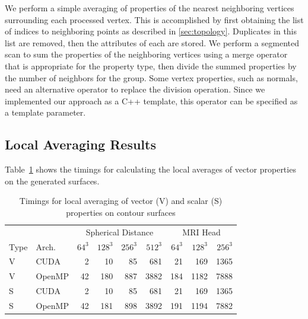 \documentclass[journal]{vgtc}                %
\begin{document}
We perform a simple averaging of properties of the nearest neighboring vertices surrounding each processed vertex. This is accomplished by first obtaining the list of indices to neighboring points as described in \ref{sec:topology}. Duplicates in this list are removed, then the attributes of each are stored. We perform a segmented scan \cite{Blelloch1991} to sum the properties of the neighboring vertices using a merge operator that is appropriate for the property type, then divide the summed properties by the number of neighbors for the group. Some vertex properties, such as normals, need an alternative operator to replace the division operation. Since we implemented our approach as a C++ template, this operator can be specified as a template parameter.

\subsection{Local Averaging Results}

Table~\ref{tab:timingsaverage} shows the timings for calculating the local averages of vector properties on the generated surfaces.


\begin{table}[h!]
\begin{center}
\begin{tabular}{l l|r r r r|r r r}
& & \multicolumn{4}{|c|}{Spherical Distance} & \multicolumn{3}{|c}{MRI Head}\\
Type & Arch. & $64^3$ & $128^3$ & $256^3$ & $512^3$ & $64^3$ & $128^3$ & $256^3$\\
\hline
V & CUDA & 2 & 10 & 85 & 681 & 21 & 169 & 1365 \\
V & OpenMP & 42 & 180 & 887 & 3882 & 184 & 1182 & 7888 \\
S & CUDA & 2 & 10 & 85 & 681 & 21 & 169 & 1365 \\
S & OpenMP & 42 & 181 & 898 & 3892 & 191 & 1194 & 7882 \\
\end{tabular}
\end{center}
\caption{Timings for local averaging of vector (V) and scalar (S) properties on contour surfaces}
\label{tab:timingsaverage}
\end{table}
\end{document}
